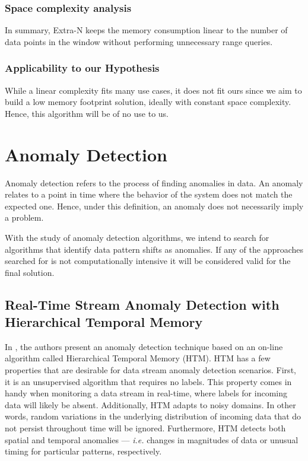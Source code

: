 \subsubsection*{Space complexity analysis}
In summary, Extra-N keeps the memory consumption linear to the number of data points in the window without performing unnecessary range queries.

\subsubsection*{Applicability to our Hypothesis}
While a linear complexity fits many use cases, it does not fit ours since we aim to build a low memory footprint solution, ideally with constant space complexity. Hence, this algorithm will be of no use to us.

\section{Anomaly Detection}
Anomaly detection refers to the process of finding anomalies in data. An anomaly relates to a point in time where the behavior of the system does not match the expected one. Hence, under this definition, an anomaly does not necessarily imply a problem. 

With the study of anomaly detection algorithms, we intend to search for algorithms that identify data pattern shifts as anomalies. If any of the approaches searched for is not computationally intensive it will be considered valid for the final solution. 

\subsection{Real-Time Stream Anomaly Detection with Hierarchical Temporal Memory}

In \cite{Ahmad-HTM}, the authors present an anomaly detection technique based on an on-line algorithm called Hierarchical Temporal Memory (HTM). HTM has a few properties that are desirable for data stream anomaly detection scenarios. First, it is an unsupervised algorithm that requires no labels. This property comes in handy when monitoring a data stream in real-time, where labels for incoming data will likely be absent. Additionally, HTM adapts to noisy domains. In other words, random variations in the underlying distribution of incoming data that do not persist throughout time will be ignored. Furthermore, HTM detects both spatial and temporal anomalies --- \textit{i.e.} changes in magnitudes of data or unusual timing for particular patterns, respectively.   

